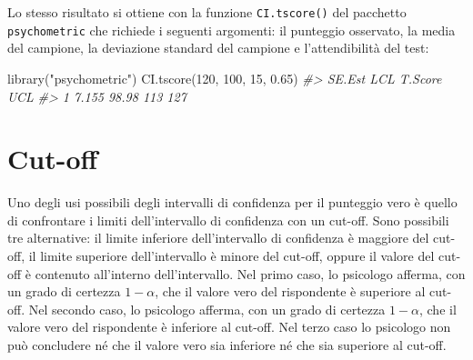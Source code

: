 \documentclass[
  11pt,
]{krantz}
\makeatletter
\newenvironment{Shaded}{\begin{snugshade}}{\end{snugshade}}
\newcommand{\CommentTok}[1]{\textcolor[rgb]{0.37,0.37,0.37}{\textit{#1}}}
\newcommand{\DecValTok}[1]{\textcolor[rgb]{0.06,0.06,0.06}{#1}}
\newcommand{\FloatTok}[1]{\textcolor[rgb]{0.06,0.06,0.06}{#1}}
\newcommand{\FunctionTok}[1]{\textcolor[rgb]{0,0,0}{#1}}
\newcommand{\NormalTok}[1]{#1}
\newcommand{\StringTok}[1]{\textcolor[rgb]{0.5,0.5,0.5}{#1}}
\newenvironment{kframe}{%
\medskip{}
\setlength{\fboxsep}{.8em}
 \def\at@end@of@kframe{}%
 \ifinner\ifhmode%
  \def\at@end@of@kframe{\end{minipage}}%
  \begin{minipage}{\columnwidth}%
 \fi\fi%
 \def\FrameCommand##1{\hskip\@totalleftmargin \hskip-\fboxsep
 \colorbox{shadecolor}{##1}\hskip-\fboxsep
     \hskip-\linewidth \hskip-\@totalleftmargin \hskip\columnwidth}%
 \MakeFramed {\advance\hsize-\width
   \@totalleftmargin\z@ \linewidth\hsize
   \@setminipage}}%
 {\par\unskip\endMakeFramed%
 \at@end@of@kframe}
\renewenvironment{Shaded}{\begin{kframe}}{\end{kframe}}
\theoremstyle{definition}
\theoremstyle{definition}
\theoremstyle{definition}
\theoremstyle{definition}
\theoremstyle{remark}
\makeatother
\begin{document}
Lo stesso risultato si ottiene con la funzione \texttt{CI.tscore()} del pacchetto \texttt{psychometric} che richiede i seguenti argomenti: il punteggio osservato, la media del campione, la deviazione standard del campione e l'attendibilità del test:

\begin{Shaded}
\begin{Highlighting}[]
\FunctionTok{library}\NormalTok{(}\StringTok{"psychometric"}\NormalTok{)}
\FunctionTok{CI.tscore}\NormalTok{(}\DecValTok{120}\NormalTok{, }\DecValTok{100}\NormalTok{, }\DecValTok{15}\NormalTok{, }\FloatTok{0.65}\NormalTok{)}
\CommentTok{\#\textgreater{}   SE.Est   LCL T.Score UCL}
\CommentTok{\#\textgreater{} 1  7.155 98.98     113 127}
\end{Highlighting}
\end{Shaded}

\hypertarget{cut-off}{%
\section{Cut-off}\label{cut-off}}

Uno degli usi possibili degli intervalli di confidenza per il punteggio vero è quello di confrontare i limiti dell'intervallo di confidenza con un cut-off. Sono possibili tre alternative: il limite inferiore dell'intervallo di confidenza è maggiore del cut-off, il limite superiore dell'intervallo è minore del cut-off, oppure il valore del cut-off è contenuto all'interno dell'intervallo. Nel primo caso, lo psicologo afferma, con un grado di certezza \(1 -\alpha\), che il valore vero del rispondente è superiore al cut-off. Nel secondo caso, lo psicologo afferma, con un grado di certezza \(1 -\alpha\), che il valore vero del rispondente è inferiore al cut-off. Nel terzo caso lo psicologo non può concludere né che il valore vero sia inferiore né che sia superiore al cut-off.
\end{document}
